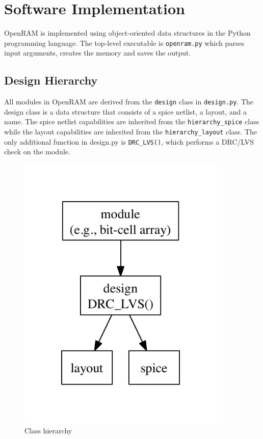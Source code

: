 \section{Software Implementation}
\label{sec:implementation}

OpenRAM is implemented using object-oriented data structures in the
Python programming language. The top-level executable is
\verb|openram.py| which parses input arguments, creates the memory and
saves the output.


\subsection{Design Hierarchy}
\label{sec:design}

All modules in OpenRAM are derived from the \verb|design| class in
\verb|design.py|. The design class is a data structure that consists
of a spice netlist, a layout, and a name. The spice netlist
capabilities are inherited from the \verb|hierarchy_spice| class while
the layout capabilities are inherited from the \verb|hierarchy_layout|
class.  The only additional function in design.py is \verb|DRC_LVS()|,
which performs a DRC/LVS check on the module.


\begin{figure}[htb]
\centering
\includegraphics[width=10cm]{./figs/class_hierarchy.pdf}
\caption{Class hierarchy}
\label{fig:class_hierarchy}
\end{figure}

